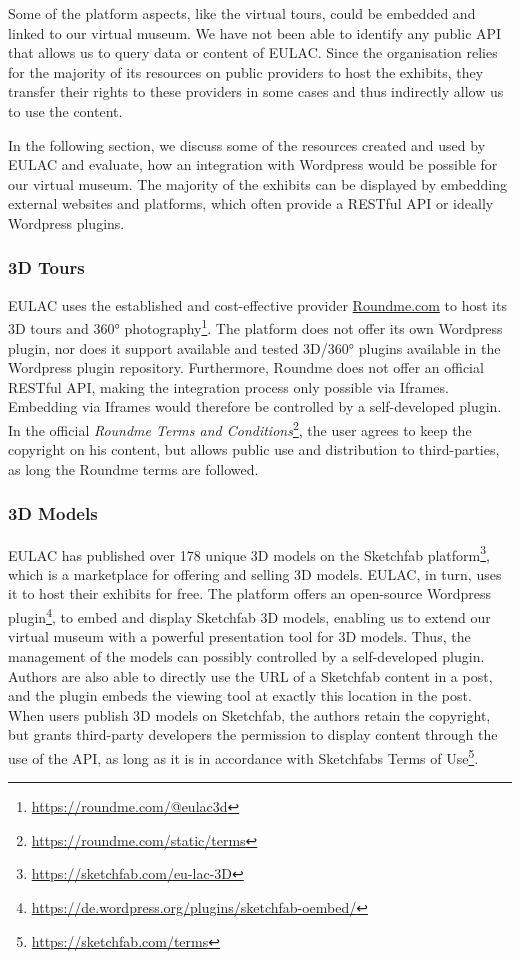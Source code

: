 \noindent Some of the platform aspects, like the virtual tours, could be embedded and linked to our virtual museum. We have not been able to identify any public API that allows us to query data or content of EULAC. Since the organisation relies for the majority of its resources on public providers to host the exhibits, they transfer their rights to these providers in some cases and thus indirectly allow us to use the content.

In the following section, we discuss some of the resources created and used by EULAC and evaluate, how an integration with Wordpress would be possible for our virtual museum. The majority of the exhibits can be displayed by embedding external websites and platforms, which often provide a RESTful API or ideally Wordpress plugins.

\subsubsection{3D Tours}

EULAC uses the established and cost-effective provider \url{Roundme.com} to host its 3D tours and 360° photography\footnote{\url{https://roundme.com/@eulac3d}}. The platform does not offer its own Wordpress plugin, nor does it support available and tested 3D/360° plugins available in the Wordpress plugin repository. Furthermore, Roundme does not offer an official RESTful API, making the integration process only possible via Iframes. Embedding via Iframes would therefore be controlled by a self-developed plugin. In the official \emph{Roundme Terms and Conditions}\footnote{\url{https://roundme.com/static/terms}}, the user agrees to keep the copyright on his content, but allows public use and distribution to third-parties, as long the Roundme terms are followed.


\subsubsection{3D Models}

EULAC has published over 178 unique 3D models on the Sketchfab platform\footnote{\url{https://sketchfab.com/eu-lac-3D}}, which is a marketplace for offering and selling 3D models. EULAC, in turn, uses it to host their exhibits for free. The platform offers an open-source Wordpress plugin\footnote{\url{https://de.wordpress.org/plugins/sketchfab-oembed/}}, to embed and display Sketchfab 3D models, enabling us to extend our virtual museum with a powerful presentation tool for 3D models. Thus, the management of the models can possibly controlled by a self-developed plugin. Authors are also able to directly use the URL of a Sketchfab content in a post, and the plugin embeds the viewing tool at exactly this location in the post. When users publish 3D models on Sketchfab, the authors retain the copyright, but grants third-party developers the permission to display content through the use of the API, as long as it is in accordance with Sketchfabs Terms of Use\footnote{\url{https://sketchfab.com/terms}}.



